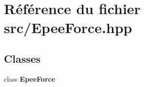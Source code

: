 \section{Référence du fichier src/\-Epee\-Force.hpp}
\label{_epee_force_8hpp}
\subsection*{Classes}
\begin{DoxyCompactItemize}
\item 
class {\bf Epee\-Force}
\end{DoxyCompactItemize}

